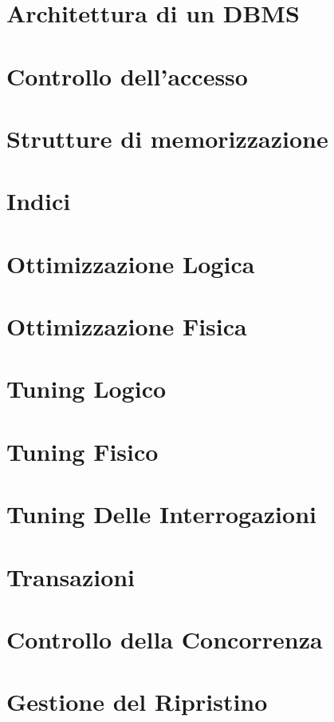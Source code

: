 \documentclass[10pt]{article}
\begin{document}
\section{Architettura di un DBMS}


\break
\section{Controllo dell'accesso}


\break
\section{Strutture di memorizzazione}


\section{Indici}


\section{Ottimizzazione Logica}


\break
\section{Ottimizzazione Fisica}


\break
\section{Tuning Logico}


\section{Tuning Fisico}


\section{Tuning Delle Interrogazioni}


\section{Transazioni}


\section{Controllo della Concorrenza}


\section{Gestione del Ripristino}

\end{document}
